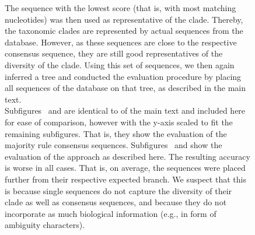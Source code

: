 \begin{figure}[hpbt]
{        The sequence with the lowest score (that is, with most matching nucleotides)
        was then used as representative of the clade.
        Thereby, the taxonomic clades are represented by actual sequences from the database.
        However, as these sequences are close to the respective consensus sequence,
        they are still good representatives of the diversity of the clade.
        Using this set of sequences, we then again inferred a tree and
        conducted the evaluation procedure by placing all sequences of the database on that tree,
        as described in the main text.
        \\
        Subfigures~
        and  are identical to
         of the main text and included here for ease of comparison,
        however with the y-axis scaled to fit the remaining subfigures.
        That is, they show the evaluation of the majority rule consensus sequences.
        Subfigures~ and 
        show the evaluation of the approach as described here.
        The resulting accuracy is worse in all cases.
        That is, on average, the sequences were placed further from their respective expected branch.
        We suspect that this is because single sequences do not capture the diversity of their clade
        as well as consensus sequences, and because they do not incorporate as much biological information
        (e.g., in form of ambiguity characters).
    }
    \label{fig:single_seqs}
\end{figure}



